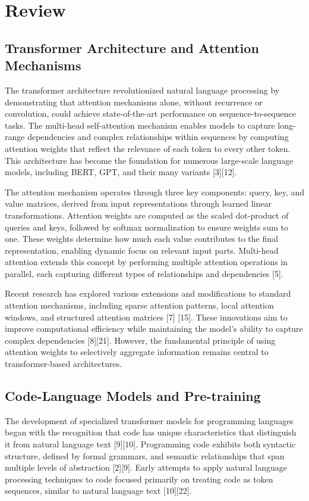 \documentclass[conference]{IEEEtran}
\begin{document}
\section{Review}
\subsection{Transformer Architecture and Attention Mechanisms}
The transformer architecture revolutionized natural language processing by demonstrating that attention mechanisms alone, without recurrence or convolution, could achieve state-of-the-art performance on sequence-to-sequence tasks. The multi-head self-attention mechanism enables models to capture long-range dependencies and complex relationships within sequences by computing attention weights that reflect the relevance of each token to every other token. This architecture has become the foundation for numerous large-scale language models, including BERT, GPT, and their many variants [3][12].

The attention mechanism operates through three key components: query, key, and value matrices, derived from input representations through learned linear transformations. Attention weights are computed as the scaled dot-product of queries and keys, followed by softmax normalization to ensure weights sum to one. These weights determine how much each value contributes to the final representation, enabling dynamic focus on relevant input parts. Multi-head attention extends this concept by performing multiple attention operations in parallel, each capturing different types of relationships and dependencies [5].

Recent research has explored various extensions and modifications to standard attention mechanisms, including sparse attention patterns, local attention windows, and structured attention matrices [7] [15]. These innovations aim to improve computational efficiency while maintaining the model's ability to capture complex dependencies [8][21]. However, the fundamental principle of using attention weights to selectively aggregate information remains central to transformer-based architectures.

\subsection{Code-Language Models and Pre-training}
The development of specialized transformer models for programming languages began with the recognition that code has unique characteristics that distinguish it from natural language text [9][10]. Programming code exhibits both syntactic structure, defined by formal grammars, and semantic relationships that span multiple levels of abstraction [2][9]. Early attempts to apply natural language processing techniques to code focused primarily on treating code as token sequences, similar to natural language text [10][22].
\end{document}
